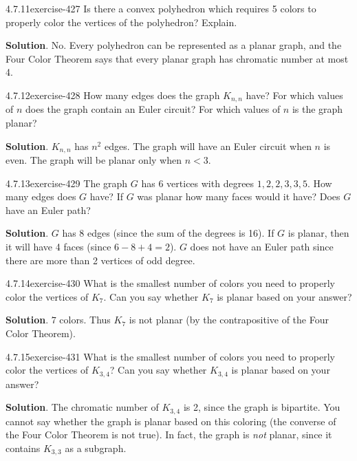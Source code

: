 \documentclass[twoside,11pt,]{book}
\numberwithin{equation}{chapter}
\newcommand{\lt}{<}
\begin{document}
\begin{divisionsolution}{4.7.11}{}{exercise-427}%
\hypertarget{p-4960}{}%
Is there a convex polyhedron which requires 5 colors to properly color the vertices of the polyhedron? Explain.%
\par\smallskip%
\noindent\textbf{Solution}.\quad%
\hypertarget{p-4961}{}%
No. Every polyhedron can be represented as a planar graph, and the Four Color Theorem says that every planar graph has chromatic number at most 4.%
\end{divisionsolution}%
\begin{divisionsolution}{4.7.12}{}{exercise-428}%
\hypertarget{p-4962}{}%
How many edges does the graph \(K_{n,n}\) have? For which values of \(n\) does the graph contain an Euler circuit? For which values of \(n\) is the graph planar?%
\par\smallskip%
\noindent\textbf{Solution}.\quad%
\hypertarget{p-4963}{}%
\(K_{n,n}\) has \(n^2\) edges. The graph will have an Euler circuit when \(n\) is even. The graph will be planar only when \(n \lt 3\).%
\end{divisionsolution}%
\begin{divisionsolution}{4.7.13}{}{exercise-429}%
\hypertarget{p-4964}{}%
The graph \(G\) has 6 vertices with degrees \(1, 2, 2, 3, 3, 5\). How many edges does \(G\) have? If \(G\) was planar how many faces would it have? Does \(G\) have an Euler path?%
\par\smallskip%
\noindent\textbf{Solution}.\quad%
\hypertarget{p-4965}{}%
\(G\) has 8 edges (since the sum of the degrees is 16). If \(G\) is planar, then it will have 4 faces (since \(6 - 8 + 4 = 2\)). \(G\) does not have an Euler path since there are more than 2 vertices of odd degree.%
\end{divisionsolution}%
\begin{divisionsolution}{4.7.14}{}{exercise-430}%
\hypertarget{p-4966}{}%
What is the smallest number of colors you need to properly color the vertices of \(K_{7}\). Can you say whether \(K_7\) is planar based on your answer?%
\par\smallskip%
\noindent\textbf{Solution}.\quad%
\hypertarget{p-4967}{}%
\(7\) colors. Thus \(K_7\) is not planar (by the contrapositive of the Four Color Theorem).%
\end{divisionsolution}%
\begin{divisionsolution}{4.7.15}{}{exercise-431}%
\hypertarget{p-4968}{}%
What is the smallest number of colors you need to properly color the vertices of \(K_{3,4}\)? Can you say whether \(K_{3,4}\) is planar based on your answer?%
\par\smallskip%
\noindent\textbf{Solution}.\quad%
\hypertarget{p-4969}{}%
The chromatic number of \(K_{3,4}\) is 2, since the graph is bipartite. You cannot say whether the graph is planar based on this coloring (the converse of the Four Color Theorem is not true). In fact, the graph is \emph{not} planar, since it contains \(K_{3,3}\) as a subgraph.%
\end{divisionsolution}%
\end{document}
